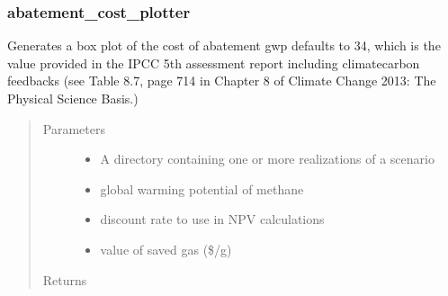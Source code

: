 \documentclass[letterpaper,10pt,english]{sphinxmanual}
\begin{document}
\subsubsection{abatement\_cost\_plotter}
\label{\detokenize{index:abatement-cost-plotter}}

\begin{fulllineitems}
\label{\detokenize{index:feast.ResultsProcessing.plotting_functions.abatement_cost_plotter}}
Generates a box plot of the cost of abatement
gwp defaults to 34, which is the value provided in the IPCC 5th assessment report including climate\sphinxhyphen{}carbon feedbacks
(see Table 8.7, page 714 in Chapter 8 of Climate Change 2013: The Physical Science Basis.)
\begin{quote}\begin{description}
\item[{Parameters}] \leavevmode\begin{itemize}
\item {} 
 \textendash{} A directory containing one or more realizations of a scenario

\item {} 
 \textendash{} global warming potential of methane

\item {} 
 \textendash{} discount rate to use in NPV calculations

\item {} 
 \textendash{} value of saved gas (\$/g)

\end{itemize}

\item[{Returns}] \leavevmode


\end{description}\end{quote}

\end{fulllineitems}
\end{document}
